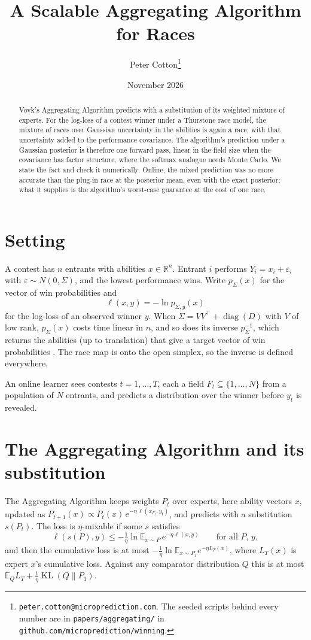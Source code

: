 \documentclass[11pt]{article}
\title{A Scalable Aggregating Algorithm for Races}
\author{Peter Cotton\thanks{\texttt{peter.cotton@microprediction.com}.
The seeded scripts behind every number are in
\texttt{papers/aggregating/} in
\texttt{github.com/microprediction/winning}.}}
\date{November 2026}
\begin{document}
\maketitle

\begin{abstract}
\noindent Vovk's Aggregating Algorithm predicts with a substitution of
its weighted mixture of experts. For the log-loss of a contest winner
under a Thurstone race model, the mixture of races over Gaussian
uncertainty in the abilities is again a race, with that uncertainty
added to the performance covariance. The algorithm's prediction under a
Gaussian posterior is therefore one forward pass, linear in the field
size when the covariance has factor structure, where the softmax
analogue needs Monte Carlo. We state the fact and check it
numerically. Online, the mixed prediction was no more accurate than
the plug-in race at the posterior mean, even with the exact posterior;
what it supplies is the algorithm's worst-case guarantee at the cost
of one race.
\end{abstract}

\section{Setting}

A contest has $n$ entrants with abilities $x\in\mathbb R^n$. Entrant
$i$ performs $Y_i=x_i+\varepsilon_i$ with $\varepsilon\sim
N(0,\Sigma)$, and the lowest performance wins. Write $p_\Sigma(x)$ for
the vector of win probabilities and
\[
  \ell(x,y)=-\ln p_{\Sigma,y}(x)
\]
for the log-loss of an observed winner $y$. When $\Sigma=V V^\top+
\operatorname{diag}(D)$ with $V$ of low rank, $p_\Sigma(x)$ costs time
linear in $n$, and so does its inverse $p_\Sigma^{-1}$, which returns
the abilities (up to translation) that give a target vector of win
probabilities \citep{cotton2026}. The race map is onto the open
simplex, so the inverse is defined everywhere.

An online learner sees contests $t=1,\dots,T$, each a field
$F_t\subseteq\{1,\dots,N\}$ from a population of $N$ entrants, and
predicts a distribution over the winner before $y_t$ is revealed.

\section{The Aggregating Algorithm and its substitution}

The Aggregating Algorithm \citep{vovk1990,vovk2001} keeps weights $P_t$
over experts, here ability vectors $x$, updated as
$P_{t+1}(x)\propto P_t(x)\,e^{-\eta\,\ell(x_{F_t},y_t)}$, and predicts
with a substitution $s(P_t)$. The loss is $\eta$-mixable if some $s$
satisfies
\begin{equation}\label{eq:mix}
  \ell(s(P),y)\le-\tfrac1\eta\ln\mathbb E_{x\sim P}\,
  e^{-\eta\,\ell(x,y)}\qquad\text{for all }P,\,y,
\end{equation}
and then the cumulative loss is at most
$-\tfrac1\eta\ln\mathbb E_{x\sim P_1}e^{-\eta L_T(x)}$, where $L_T(x)$ is
expert $x$'s cumulative loss. Against any comparator distribution $Q$
this is at most $\mathbb E_Q L_T+\tfrac1\eta\operatorname{KL}(Q\|P_1)$.
\end{document}
